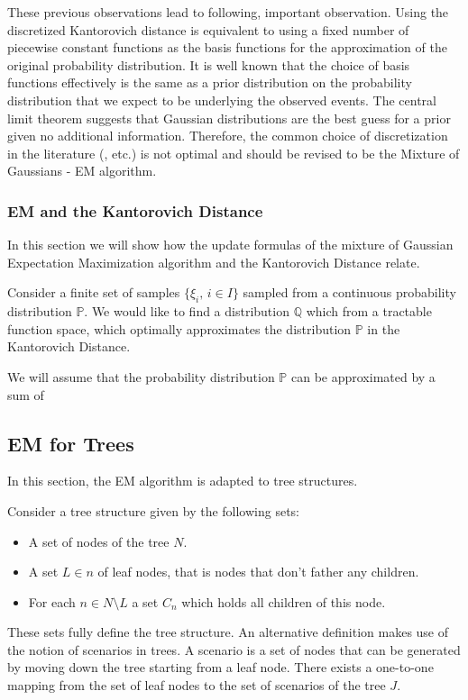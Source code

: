 These previous observations lead to following, important observation.
Using the discretized Kantorovich distance is equivalent to using a fixed number of piecewise constant functions as the basis functions for the approximation of the original probability distribution.
It is well known that the choice of basis functions effectively is the same as a prior distribution on the probability distribution that we expect to be underlying the observed events.
The central limit theorem suggests that Gaussian distributions are the best guess for a prior given no additional information.
Therefore, the common choice of discretization in the literature (\cite{Dupacova2003}, etc.) is not optimal and should be revised to be the Mixture of Gaussians - EM algorithm.

\subsubsection{EM and the Kantorovich Distance}
\label{sec:em-kantorovich}
In this section we will show how the update formulas of the mixture of Gaussian Expectation Maximization algorithm and the Kantorovich Distance relate.

Consider a finite set of samples $\{\xi_i,\, i\in I\}$ sampled from a continuous probability distribution $\mathbb{P}$.
We would like to find a distribution $\mathbb{Q}$ which from a tractable function space, which optimally approximates the distribution $\mathbb{P}$ in the Kantorovich Distance.

We will assume that the probability distribution $\mathbb{P}$ can be approximated by a sum of  



\subsection{EM for Trees}
\label{sec:mixt-gauss-trees}
In this section, the EM algorithm is adapted to tree structures. 

Consider a tree structure given by the following sets:
\begin{itemize}
\item A set of nodes of the tree $N$.
\item A set $L\in n$ of leaf nodes, that is nodes that don't father any children.
\item For each $n\in N\setminus L$ a set $C_n$ which holds all children of this node.
\end{itemize}
These sets fully define the tree structure.
An alternative definition makes use of the notion of scenarios in trees.
A scenario is a set of nodes that can be generated by moving down the tree starting from a leaf node.
There exists a one-to-one mapping from the set of leaf nodes to the set of scenarios of the tree $J$.

